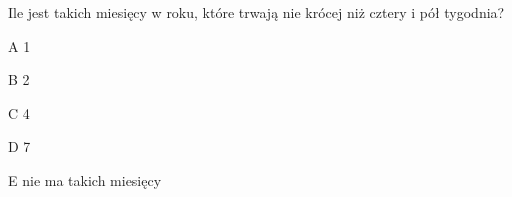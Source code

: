 \begin{tresc}
Ile jest takich miesięcy w roku, które trwają nie krócej niż cztery i pół tygodnia?
\end{tresc}
\begin{wariant}{A} 1 \end{wariant}
\begin{wariant}{B} 2 \end{wariant}
\begin{wariant}{C} 4 \end{wariant}
\begin{wariant}{D} 7 \end{wariant}
\begin{wariant}{E} nie ma takich miesięcy \end{wariant}

